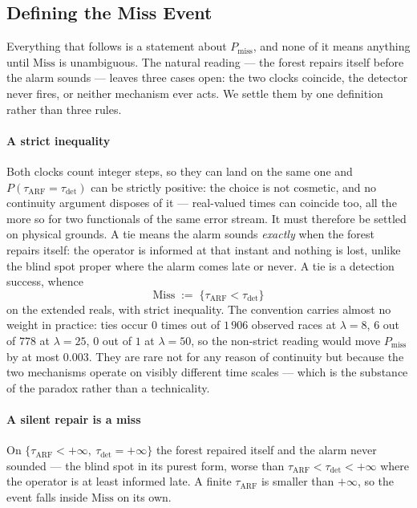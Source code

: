 \documentclass[10pt,conference]{IEEEtran}
\theoremstyle{definition}
\begin{document}
\subsection{Defining the Miss Event}
\label{sec:miss}

Everything that follows is a statement about $P_{\mathrm{miss}}$, and none of it means
anything until $\mathrm{Miss}$ is unambiguous. The natural reading --- the forest repairs
itself before the alarm sounds --- leaves three cases open: the two clocks coincide, the
detector never fires, or neither mechanism ever acts. We settle them by one definition
rather than three rules.

\paragraph{A strict inequality} Both clocks count integer steps, so they can land on
the same one and $P(\tau_{\mathrm{ARF}} = \tau_{\mathrm{det}})$ can be strictly positive:
the choice is not cosmetic, and no continuity argument disposes of it --- real-valued
times can coincide too, all the more so for two functionals of the same error stream.
It must therefore be settled on physical grounds. A tie means the alarm sounds
\emph{exactly} when the forest repairs itself: the operator is informed at that instant
and nothing is lost, unlike the blind spot proper where the alarm comes late or never. A
tie is a detection success, whence
\[
  \mathrm{Miss} \;:=\; \{\tau_{\mathrm{ARF}} < \tau_{\mathrm{det}}\}
\]
on the extended reals, with strict inequality.
The convention carries almost no weight in practice: ties occur $0$ times out of
$1\,906$ observed races at $\lambda = 8$, $6$ out of $778$ at $\lambda = 25$, $0$ out of
$1$ at $\lambda = 50$, so the non-strict reading would move $P_{\mathrm{miss}}$ by at
most $0.003$. They are rare not for any reason of continuity but because the two
mechanisms operate on visibly different time scales --- which is the substance of the
paradox rather than a technicality.

\paragraph{A silent repair is a miss} On
$\{\tau_{\mathrm{ARF}} < +\infty,\ \tau_{\mathrm{det}} = +\infty\}$ the forest repaired
itself and the alarm never sounded --- the blind spot in its purest form, worse than
$\tau_{\mathrm{ARF}} < \tau_{\mathrm{det}} < +\infty$ where the operator is at least
informed late. A finite $\tau_{\mathrm{ARF}}$ is smaller than $+\infty$, so the event
falls inside $\mathrm{Miss}$ on its own.
\end{document}
